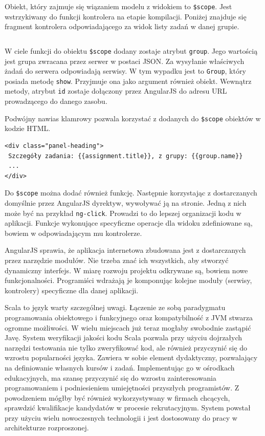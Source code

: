 \documentclass[brudnopis]{xmgr}
\begin{document}
Obiekt, który zajmuje się wiązaniem modelu z widokiem to \texttt{\$scope}. Jest wstrzykiwany do funkcji kontrolera na etapie kompilacji. Poniżej znajduje się fragment kontrolera odpowiadającego za widok listy zadań w danej grupie.

\inputminted[fontsize=\small]{javascript}{code/angularController.js} 

W ciele funkcji do obiektu \texttt{\$scope} dodany zostaje atrybut \texttt{group}. Jego wartością jest grupa zwracana przez serwer w postaci JSON. Za wysyłanie właściwych żadań do serwera odpowiadają serwisy. W tym wypadku jest to \texttt{Group}, który posiada metodę \texttt{show}. Przyjmuje ona jako argument również obiekt. Wewnątrz metody, atrybut \texttt{id} zostaje dołączony przez AngularJS do adresu URL prowadzącego do danego zasobu.

Podwójny nawias klamrowy pozwala korzystać z dodanych do \texttt{\$scope} obiektów w kodzie HTML. 

\begin{verbatim}
<div class="panel-heading">
 Szczegóły zadania: {{assignment.title}}, z grupy: {{group.name}}
 ...
</div>
\end{verbatim}

Do \texttt{\$scope} można dodać również funkcję. Następnie korzystając z dostarczanych domyślnie przez AngularJS dyrektyw, wywoływać ją na stronie. Jedną z nich może być na przykład \texttt{ng-click}. Prowadzi to do lepszej organizacji kodu w aplikacji. Funkcje wykonujące specyficzne operacje dla widoku zdefiniowane są, bowiem w odpowiadającym mu kontrolerze. 

AngularJS sprawia, że aplikacja internetowa zbudowana jest z dostarczanych przez narzędzie modułów. Nie trzeba znać ich wszystkich, aby stworzyć dynamiczny interfejs. W miarę rozwoju projektu odkrywane są, bowiem nowe funkcjonalności. Programiści wdrażają je komponując kolejne moduły (serwisy, kontrolery) specyficzne dla danej aplikacji.  

\summary
Scala to język warty szczególnej uwagi. Łączenie ze sobą paradygmatu programowania obiektowego i funkcyjnego oraz kompatybilność z JVM stwarza ogromne możliwości. W wielu miejscach już teraz mogłaby swobodnie zastąpić Javę. System weryfikacji jakości kodu Scala pozwala przy użyciu dojrzałych narzędzi testowania nie tylko zweryfikować kod, ale również przyczynić się do wzrostu popularności języka. Zawiera w sobie element dydaktyczny, pozwalający na definiowanie własnych kursów i zadań. Implementując go w ośrodkach edukacyjnych, ma szansę przyczynić się do wzrostu zainteresowania programowaniem i podniesieniem umiejętności przyszłych programistów. Z powodzeniem mógłby być również wykorzystywany w firmach chcących, sprawdzić kwalifikacje kandydatów w procesie rekrutacyjnym.
System powstał przy użyciu wielu nowoczesnych technologii i jest dostosowany do pracy w architekturze rozproszonej.
\end{document}
